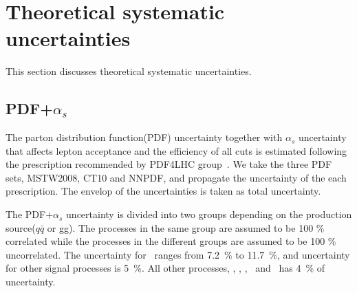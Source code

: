 \section{Theoretical systematic uncertainties}

This section discusses theoretical systematic uncertainties. 

\subsection{PDF+$\alpha_s$}

The parton distribution function(PDF) uncertainty together with $\alpha_s$ uncertainty 
that affects lepton acceptance and the efficiency of all cuts 
is estimated following the prescription recommended by PDF4LHC group~\cite{}. 
We take the three PDF sets, MSTW2008, CT10 and NNPDF, 
and propagate the uncertainty of the each prescription. 
The envelop of the uncertainties is taken as total uncertainty. 

The PDF+$\alpha_s$ uncertainty is divided into two groups depending on the 
production source($q\bar{q}$ or gg). 
The processes in the same group are assumed to be 100 \% correlated 
while the processes in the different groups are assumed to be 100 \% uncorrelated.
The uncertainty for \ggH\ ranges from 7.2~\% to 11.7~\%,  
and uncertainty for other signal processes is 5~\%.
All other processes, \ggww, \qqww, \vv, \wgamma\ and \wgammastar\  has 4~\% of uncertainty.

